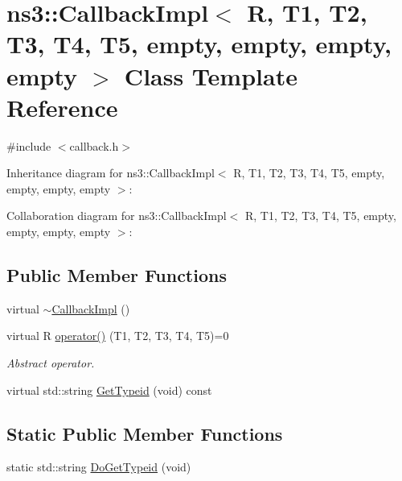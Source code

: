 \hypertarget{classns3_1_1CallbackImpl_3_01R_00_01T1_00_01T2_00_01T3_00_01T4_00_01T5_00_01empty_00_01empty_00_01empty_00_01empty_01_4}{}\section{ns3\+:\+:Callback\+Impl$<$ R, T1, T2, T3, T4, T5, empty, empty, empty, empty $>$ Class Template Reference}
\label{classns3_1_1CallbackImpl_3_01R_00_01T1_00_01T2_00_01T3_00_01T4_00_01T5_00_01empty_00_01empty_00_01empty_00_01empty_01_4}


{\ttfamily \#include $<$callback.\+h$>$}



Inheritance diagram for ns3\+:\+:Callback\+Impl$<$ R, T1, T2, T3, T4, T5, empty, empty, empty, empty $>$\+:


Collaboration diagram for ns3\+:\+:Callback\+Impl$<$ R, T1, T2, T3, T4, T5, empty, empty, empty, empty $>$\+:
\subsection*{Public Member Functions}
\begin{DoxyCompactItemize}
\item 
virtual \hyperlink{classns3_1_1CallbackImpl_3_01R_00_01T1_00_01T2_00_01T3_00_01T4_00_01T5_00_01empty_00_01empty_00_01empty_00_01empty_01_4_afdcdc6259619d778c1fd4d441f6c43fb}{$\sim$\+Callback\+Impl} ()
\item 
virtual R \hyperlink{classns3_1_1CallbackImpl_3_01R_00_01T1_00_01T2_00_01T3_00_01T4_00_01T5_00_01empty_00_01empty_00_01empty_00_01empty_01_4_a2a9094b586bccd721c9db3e17743f528}{operator()} (T1, T2, T3, T4, T5)=0
\begin{DoxyCompactList}\small\item\em Abstract operator. \end{DoxyCompactList}\item 
virtual std\+::string \hyperlink{classns3_1_1CallbackImpl_3_01R_00_01T1_00_01T2_00_01T3_00_01T4_00_01T5_00_01empty_00_01empty_00_01empty_00_01empty_01_4_ad9175d8bedf1e49f3566473a71439e45}{Get\+Typeid} (void) const 
\end{DoxyCompactItemize}
\subsection*{Static Public Member Functions}
\begin{DoxyCompactItemize}
\item 
static std\+::string \hyperlink{classns3_1_1CallbackImpl_3_01R_00_01T1_00_01T2_00_01T3_00_01T4_00_01T5_00_01empty_00_01empty_00_01empty_00_01empty_01_4_abffb3ac8eea286e290944c88442cb16e}{Do\+Get\+Typeid} (void)
\end{DoxyCompactItemize}
